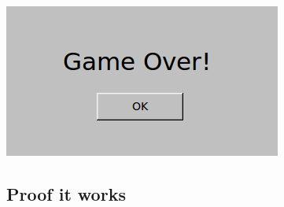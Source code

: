 \documentclass {article}
\begin{document}
\includegraphics[scale=0.5]{dance04.png}

\clearpage
\subsection*{Proof it works}

\end{document}
